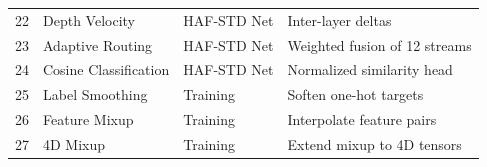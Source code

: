 \documentclass[12pt, a4paper]{article}
\begin{document}
\begin{summarybox}
\begin{center}
\begin{tabular}{clll}
22 & Depth Velocity & HAF-STD Net & Inter-layer deltas \\
23 & Adaptive Routing & HAF-STD Net & Weighted fusion of 12 streams \\
24 & Cosine Classification & HAF-STD Net & Normalized similarity head \\
\midrule
25 & Label Smoothing & Training & Soften one-hot targets \\
26 & Feature Mixup & Training & Interpolate feature pairs \\
27 & 4D Mixup & Training & Extend mixup to 4D tensors \\
\bottomrule
\end{tabular}
\end{center}
\end{summarybox}
\end{document}
